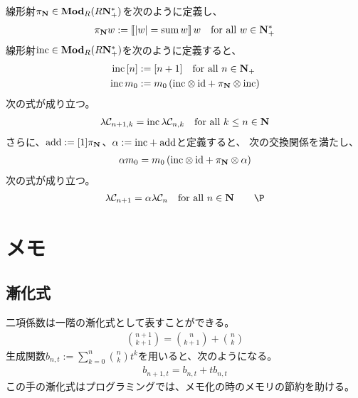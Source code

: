 {	\begin{proposition}[数の合成の増分]\label{prop:数の合成の増分} %
		線形射$\pi_{\mathbf{N}}\in{\mathbf{Mod}}_R(R\mathbf{N}_+^*)$を次のように定義し、
		\begin{equation*}\begin{split}
			\pi_{\mathbf{N}} w := \mathinner{[\![|w|=\mathinner{\operatorname{sum}}w]\!]} w \quad\text{for all } w\in\mathbf{N}_+^*
		\end{split}\end{equation*}
		線形射$\mathinner{\operatorname{inc}}\in{\mathbf{Mod}}_R(R\mathbf{N}_+^*)$を次のように定義すると、
		\begin{equation*}\begin{split}
			\mathinner{\operatorname{inc}}{\mathinner{\left[{n}\right]}} &:= {\mathinner{\left[{n+1}\right]}} \quad\text{for all } n\in\mathbf{N}_+ \\
			\mathinner{\operatorname{inc}}m_0 &:= m_0\mathinner{({\mathinner{\operatorname{inc}}\otimes\mathinner{\operatorname{id}}+ \pi_{\ensuremath{\mathbf{N}}}\otimes\mathinner{\operatorname{inc}}})} \\
		\end{split}\end{equation*}
		次の式が成り立つ。
		\begin{equation*}\begin{split}
			\lambda{\mathcal{C}}_{n+1,k} = \mathinner{\operatorname{inc}}\lambda{\mathcal{C}}_{n,k}
				\quad\text{for all } k\le n\in\mathbf{N}
		\end{split}\end{equation*}
		さらに、$\mathinner{\operatorname{add}}:=[1]\pi_{\mathbf{N}}$、$\alpha:=\mathinner{\operatorname{inc}}+\mathinner{\operatorname{add}}$と定義すると、
		次の交換関係を満たし、
		\begin{equation*}\begin{split}
			\alpha m_0 = m_0\mathinner{({\mathinner{\operatorname{inc}}\otimes\mathinner{\operatorname{id}}+ \pi_{\ensuremath{\mathbf{N}}}\otimes\alpha})}
		\end{split}\end{equation*}
		次の式が成り立つ。
		\begin{equation*}\begin{split}
			\lambda\clC_{n+1} = \alpha\lambda\clC_{n} \quad\text{for all } n\in\sizen
				\qquad\EOP
		\end{split}\end{equation*}
	\end{proposition} %
\section{メモ}\label{s1:メモ} %
\subsection{漸化式}\label{s2:漸化式} %
	二項係数は一階の漸化式として表すことができる。
	\begin{equation*}\begin{split}
		\binom{n+1}{k+1} = \binom{n}{k+1} + \binom{n}{k}
	\end{split}\end{equation*}
	生成関数$b_{n,t}:=\sum_{k=0}^n\binom{n}{k}t^k$を用いると、次のようになる。
	\begin{equation*}\begin{split}
		b_{n+1,t} = b_{n,t} + tb_{n,t}
	\end{split}\end{equation*}
	この手の漸化式はプログラミングでは、メモ化の時のメモリの節約を助ける。
}
